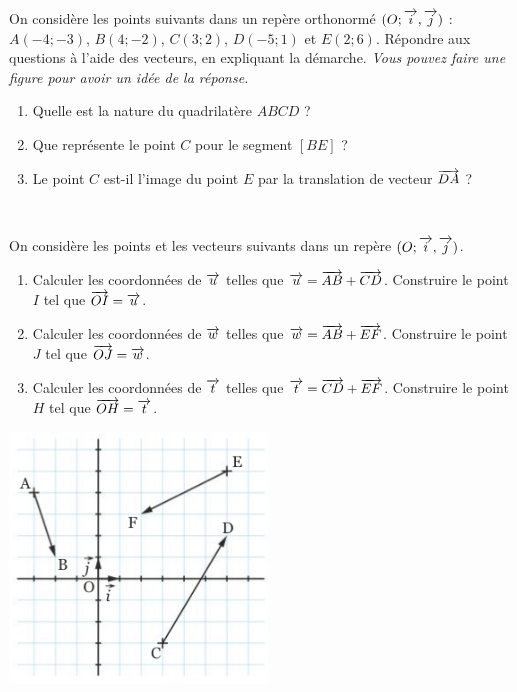 \documentclass[11pt]{article}
\begin{document}
\begin{exo}
  On considère les points suivants dans un repère orthonormé $(O; \overrightarrow{i}, \overrightarrow{j})$ : $A(-4; -3)$, $B(4; -2)$, $C(3; 2)$, $D(-5; 1)$ et $E(2; 6)$. Répondre
  aux questions à l'aide des vecteurs, en expliquant la démarche.
  \emph{Vous pouvez faire une figure pour avoir un idée de la réponse.}
  \begin{enumerate}
    \item Quelle est la nature du quadrilatère $ABCD$ ?
    \item Que représente le point $C$ pour le segment $\left[ BE \right]$ ?
    \item Le point $C$ est-il l'image du point $E$ par la translation de vecteur
      $\overrightarrow{DA}$ ?
  \end{enumerate}
\end{exo}

\begin{exo}~\\[-3mm]
  \begin{minipage}[]{.6\textwidth}
    On considère les points et les vecteurs suivants dans un repère $(O; \overrightarrow{i}, \overrightarrow{j})$.
    \begin{enumerate}
      \item Calculer les coordonnées de $\overrightarrow{u}$ telles que $\overrightarrow{u}=\overrightarrow{AB}+\overrightarrow{CD}$. Construire le point $I$ tel que
        $\overrightarrow{OI}=\overrightarrow{u}$.
      \item Calculer les coordonnées de $\overrightarrow{w}$ telles que $\overrightarrow{w}=\overrightarrow{AB}+\overrightarrow{EF}$. Construire le point $J$ tel que
        $\overrightarrow{OJ}=\overrightarrow{w}$.
      \item Calculer les coordonnées de $\overrightarrow{t}$ telles que $\overrightarrow{t}=\overrightarrow{CD}+\overrightarrow{EF}$. Construire le point $H$ tel que
        $\overrightarrow{OH}=\overrightarrow{t}$.
    \end{enumerate}
  \end{minipage}
  \begin{minipage}[]{.4\textwidth}
    \begin{center}
      \includegraphics[scale=.6]{quad5.png}
    \end{center}
  \end{minipage}
\end{exo}
\end{document}
